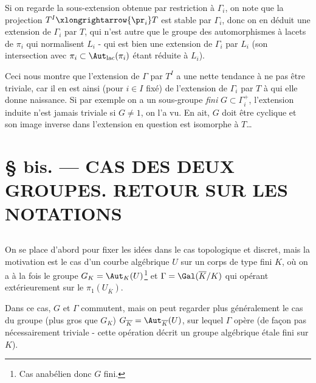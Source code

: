 Si on regarde la sous-extension obtenue par restriction à $\Gamma_i$, on note que la projection $T^I \xlongrightarrow{\pr_i} T$ est stable par $\Gamma_i$, donc on en déduit  une extension de $\Gamma_i$ par $T$, qui n'est autre que le groupe des automorphismes à lacets de $\pi_i$ qui normalisent $L_i$ - qui est bien une extension de $\Gamma_i$ par $L_i$ (son intersection avec $\pi_i \subset  \Aut_{\text{lac}}(\pi_i)$ étant réduite à $L_i$).

Ceci nous montre que l'extension de $\Gamma$ par $T^I$ a une nette tendance à ne pas être triviale, car il en est ainsi (pour $i \in I$ fixé) de l'extension de $\Gamma_i$ par $T$ à qui elle donne naissance. Si par exemple on a un sous-groupe \emph{fini} $G \subset  \Gamma^+_i$, l'extension induite n'est jamais triviale si $G \neq 1$, on l'a vu. En ait, $G$ doit être cyclique et son image inverse dans l'extension en question est isomorphe à $T$\dots













\chapter*{\S {} bis. --- CAS DES DEUX GROUPES. RETOUR SUR LES NOTATIONS}\thispagestyle{empty}
\label{sec:25bis}
\section*{}

On se place d'abord pour fixer les idées dans le cas topologique et discret, mais la motivation est le cas d'un courbe algébrique $U$ sur un corps de type fini $K$, où on a à la fois le groupe $G_K = \Aut_K(U)$\footnote{Cas anabélien donc $G$ fini.} et $\Gamma = \Gal(\overline{K}/K)$ qui opérant extérieurement sur le $\pi_1(U_{\overline{K}})$.

Dans ce cas, $G$ et $\Gamma$ commutent, mais on peut regarder plus généralement le cas du groupe (plus gros que $G_K$) $G_{\overline{K}} = \Aut_{\overline{K}}(U)$, sur lequel $\Gamma$ opère (de fa\c{c}on pas nécessairement triviale - cette opération décrit un groupe algébrique étale fini sur $K$).

